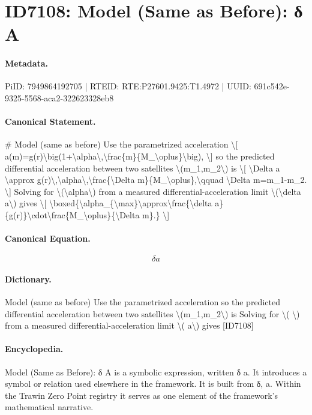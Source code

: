 \section*{ID7108: Model (Same as Before): δ A}
\paragraph{Metadata.}
PiID: 7949864192705 | RTEID: RTE:P27601.9425:T1.4972 | UUID: 691c542e-9325-5568-aca2-322623328eb8

\paragraph{Canonical Statement.}
\# Model (same as before) Use the parametrized acceleration \textbackslash{}[ a(m)=g(r)\textbackslash{}big(1+\textbackslash{}alpha\textbackslash{},\textbackslash{}frac\{m\}\{M\_\textbackslash{}oplus\}\textbackslash{}big), \textbackslash{}] so the predicted differential acceleration between two satellites \textbackslash{}(m\_1,m\_2\textbackslash{}) is \textbackslash{}[ \textbackslash{}Delta a \textbackslash{}approx g(r)\textbackslash{},\textbackslash{}alpha\textbackslash{},\textbackslash{}frac\{\textbackslash{}Delta m\}\{M\_\textbackslash{}oplus\},\textbackslash{}qquad \textbackslash{}Delta m=m\_1-m\_2. \textbackslash{}] Solving for \textbackslash{}(\textbackslash{}alpha\textbackslash{}) from a measured differential-acceleration limit \textbackslash{}(\textbackslash{}delta a\textbackslash{}) gives \textbackslash{}[ \textbackslash{}boxed\{\textbackslash{}alpha\_\{\textbackslash{}max\}\textbackslash{}approx\textbackslash{}frac\{\textbackslash{}delta a\}\{g(r)\}\textbackslash{}cdot\textbackslash{}frac\{M\_\textbackslash{}oplus\}\{\textbackslash{}Delta m\}.\} \textbackslash{}]

\paragraph{Canonical Equation.}
\[
\delta a
\]

\paragraph{Dictionary.}
Model (same as before) Use the parametrized acceleration so the predicted differential acceleration between two satellites \textbackslash{}(m\_1,m\_2\textbackslash{}) is Solving for \textbackslash{}( \textbackslash{}) from a measured differential-acceleration limit \textbackslash{}( a\textbackslash{}) gives [ID7108]

\paragraph{Encyclopedia.}
Model (Same as Before): δ A is a symbolic expression, written δ a. It introduces a symbol or relation used elsewhere in the framework. It is built from δ, a. Within the Trawin Zero Point registry it serves as one element of the framework's mathematical narrative.
